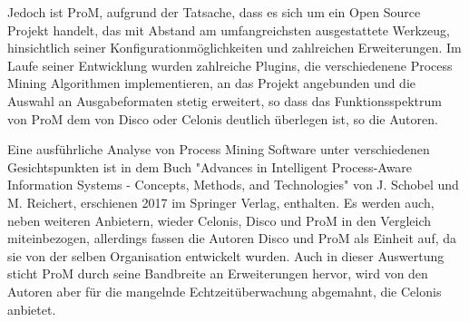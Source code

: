 \begin{table}[!h]
\centering
{}
\caption{Angaben von Anwendern zu ihrem Umgang mit Process Mining Software (Quelle: Auszug aus Tabelle 5: Fragenkatalog 5, Verstraete, Comparative Study of Process Mining Software, S. 29 \cite{compPM} }
\label{comparison}
\end{table}

Jedoch ist ProM, aufgrund der Tatsache, dass es sich um ein Open Source Projekt handelt, das mit Abstand am umfangreichsten ausgestattete Werkzeug,  hinsichtlich seiner Konfigurationmöglichkeiten und zahlreichen Erweiterungen. 
Im Laufe seiner Entwicklung wurden zahlreiche Plugins, die verschiedenene Process Mining Algorithmen implementieren, an das Projekt angebunden und die Auswahl an Ausgabeformaten stetig erweitert, so dass das Funktionsspektrum von ProM dem von Disco oder Celonis deutlich überlegen ist, so die Autoren. 

Eine ausführliche Analyse von Process Mining Software unter verschiedenen Gesichtspunkten ist in dem Buch "Advances in Intelligent Process-Aware Information Systems - Concepts, Methods, and Technologies" von J. Schobel und M.  Reichert, erschienen 2017 im Springer Verlag, enthalten\cite{Schobel2017}. Es werden auch, neben weiteren Anbietern, wieder Celonis, Disco und ProM in den Vergleich miteinbezogen, allerdings fassen die Autoren Disco und ProM als Einheit auf, da sie von der selben Organisation entwickelt wurden. Auch in dieser Auswertung sticht ProM durch seine Bandbreite an Erweiterungen hervor, wird von den Autoren aber für die mangelnde Echtzeitüberwachung abgemahnt, die Celonis anbietet.

